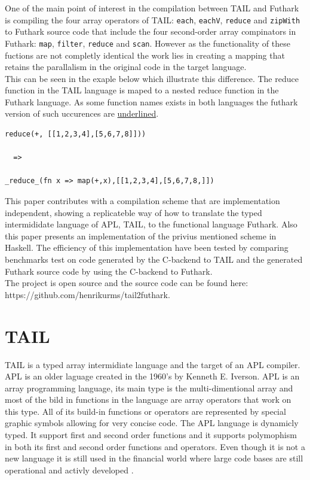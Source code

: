 \documentclass[11pt]{article}
\begin{document}
One of the main point of interest in the compilation between TAIL and Futhark is compiling the four array operators 
of TAIL: {\tt each}, {\tt eachV}, 
 {\tt reduce} and {\tt zipWith} to Futhark source code that include the four second-order array compinators in Futhark:  
 {\tt map}, {\tt filter}, {\tt reduce} and {\tt scan}. However as the functionality of these fuctions are not completly 
 identical the work lies in creating a mapping that retains the parallalism in the original code in the target language.\\
 This can be seen in the exaple below which illustrate this difference. The reduce function in the
  TAIL language is maped to a nested reduce function in the Futhark language.
  As some function names exists in both languages the futhark version of such uccurences are \underline{underlined}.

\begin{lstlisting}[numbers=none,frame=none]
reduce(+, [[1,2,3,4],[5,6,7,8]]))

  =>

_reduce_(fn x => map(+,x),[[1,2,3,4],[5,6,7,8,]])

\end{lstlisting}

This paper contributes with a compilation scheme that are implementation independent, showing a replicateble 
way of how to translate the typed intermididate language of APL, TAIL, to the functional language Futhark. Also 
this paper presents an implementation of the privius mentioned scheme in Haskell. The efficiency of this
 implementation have been tested by comparing benchmarks test on code generated by the C-backend to TAIL 
 and the generated Futhark source code by using the C-backend to Futhark. \\

The project is open source and the source code can be found here:\\ https://github.com/henrikurms/tail2futhark.

\section{TAIL}

TAIL is a typed array intermidiate language and the target of an APL compiler. APL is an older laguage created in the 1960's by Kenneth E. Iverson. APL is an array programming language, its main type is the multi-dimentional array 
and most of the bild in functions in the language are array operators that work on this type. 
All of its build-in functions or operators are represented by special graphic symbols allowing for very concise code.
The APL language is dynamicly typed. It support first and second order functions and it supports polymophism in 
both its first and second order functions and operators. 
Even though it is not a new language it is still used in the financial world 
where large code bases are still operational and activly developed \cite{ElsmanDybdal:Array:2014}. \\
\end{document}
